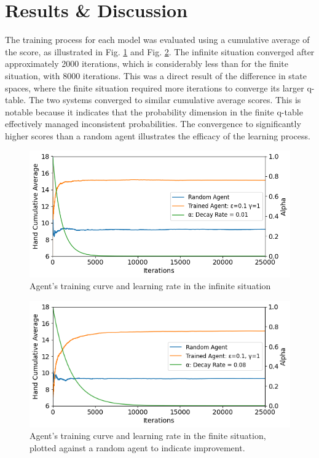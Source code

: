 \section{Results \& Discussion}

The training process for each model was evaluated using a cumulative average of the score, as illustrated in Fig. \ref{fig: Training curve - Infinite} and Fig. \ref{fig: Training curve - Finite}. The infinite situation converged after approximately 2000 iterations, which is considerably less than for the finite situation, with 8000 iterations. This was a direct result of the difference in state spaces, where the finite situation required more iterations to converge its larger q-table. The two systems converged to similar cumulative average scores. This is notable because it indicates that the probability dimension in the finite q-table effectively managed inconsistent probabilities. The convergence to significantly higher scores than a random agent illustrates the efficacy of the learning process.

\begin{figure}[ht] 
    \centering
    \includegraphics[width=\singlefigure]{figures/infinite_training_curve.png}
    \caption{Agent's training curve and learning rate in the infinite situation}
    \label{fig: Training curve - Infinite} 
\end{figure}

\begin{figure}[h] 
    \centering
    \includegraphics[width=\singlefigure]{figures/finite_training_curve.png}
    \caption{Agent's training curve and learning rate in the finite situation, plotted against a random agent to indicate improvement.}
    \label{fig: Training curve - Finite} 
\end{figure}


